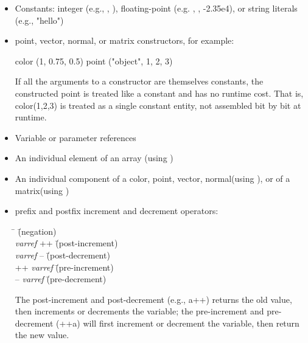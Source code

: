 \documentclass[11pt,letterpaper]{book}
\def\color{{\cf color}\xspace}
\def\matrix{{\cf matrix}\xspace}
\def\normal{{\cf normal}\xspace}
\def\point{{\cf point}\xspace}
\def\vector{{\cf vector}\xspace}
\begin{document}
\begin{itemize}
\item Constants: integer (e.g., {}, {}), floating-point
  (e.g. {}, {}, {\cf -2.35e4}), or string literals (e.g., {\cf
  "hello"})

\item point, vector, normal, or matrix constructors, for example:

\begin{code}
    color (1, 0.75, 0.5)
    point ("object", 1, 2, 3)
\end{code}

If all the arguments to a constructor are themselves constants, the
constructed point is treated like a constant and has no runtime cost.
That is, {\cf color(1,2,3)} is treated as a single constant entity, not
assembled bit by bit at runtime.

\item Variable or parameter references

\item An individual element of an array (using {\cf [ ] })

\item An individual component of a \color,
\point, \vector, \normal (using {\cf [ ]}), 
or of a \matrix (using {\cf [][]})

\item prefix and postfix increment and decrement operators:

\begin{tabbing}
\hspace{.25in} \= \hspace{2in} \= (negation) \kill \\
\> \emph{varref} {\cf ++} \hspace{1in} \= (post-increment) \\
\> \emph{varref} {\cf --}  \hspace{1in} \= (post-decrement) \\
\> {\cf ++} \emph{varref} \hspace{1in} \= (pre-increment) \\
\> {\cf --} \emph{varref} \hspace{1in} \= (pre-decrement) \\
\end{tabbing}

The post-increment and post-decrement (e.g., {\cf a++}) returns the old
value, then increments or decrements the variable; the pre-increment and
pre-decrement ({\cf ++a}) will first increment or decrement the
variable, then return the new value.


\end{itemize}
\end{document}
